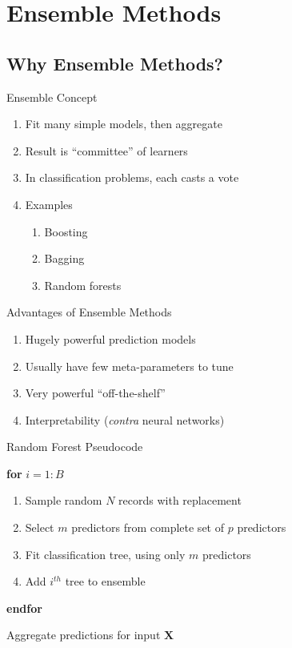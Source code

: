 \documentclass[pdf]{beamer}
\begin{document}
\section{Ensemble Methods}
	\subsection{Why Ensemble Methods?}
	
		\begin{frame}{Ensemble Concept}
			\begin{enumerate}
				\item{Fit many simple models, then aggregate}
				\item{Result is ``committee'' of learners}
				\item{In classification problems, each casts a vote}
				\item{Examples}
				\begin{enumerate}[1]
					\item{Boosting}
					\item{Bagging}
					\item{Random forests}
				\end{enumerate}
			\end{enumerate}
		\end{frame}
				
		
		\begin{frame}{Advantages of Ensemble Methods}
			\begin{enumerate}
				\item{Hugely powerful prediction models}
				\item{Usually have few meta-parameters to tune}
				\item{Very powerful ``off-the-shelf''}
				\item{Interpretability (\textit{contra} neural networks)}
			\end{enumerate}
		\end{frame}
	
	
	
	
		\begin{frame}{Random Forest Pseudocode}
			\begin{enumerate}[]
				{\selectfont
				\item{\textbf{for} $i = 1:B$}
					\begin{enumerate}[  ]
						\item{\hspace{3 mm} Sample random $N$ records with replacement}
						\item{\hspace{3 mm} Select $m$ predictors from complete set of $p$ predictors}
						\item{\hspace{3 mm} Fit classification tree, using only $m$ predictors}
						\item{\hspace{3 mm} Add $i^{th}$ tree to ensemble}
					\end{enumerate}
				\item{\textbf{endfor}}
				\item{Aggregate predictions for input $\textbf{X}$}
				}
			\end{enumerate}
		\end{frame}
	
\end{document}
